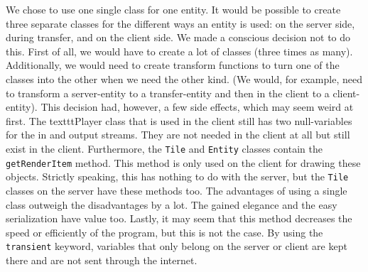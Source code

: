\documentclass[../main.tex]{subfiles}
\begin{document}
	We chose to use one single class for one entity. It would be possible to create three separate classes for the different ways an entity is used: on the server side, during transfer, and on the client side. We made a conscious decision not to do this. First of all, we would have to create a lot of classes (three times as many). Additionally, we would need to create transform functions to turn one of the classes into the other when we need the other kind. (We would, for example, need to transform a server-entity to a transfer-entity and then in the client to a client-entity). This decision had, however, a few side effects, which may seem weird at first. The texttt{Player} class that is used in the client still has two null-variables for the in and output streams. They are not needed in the client at all but still exist in the client. Furthermore, the \texttt{Tile} and \texttt{Entity} classes contain the \texttt{getRenderItem} method. This method is only used on the client for drawing these objects. Strictly speaking, this has nothing to do with the server, but the \texttt{Tile} classes on the server have these methods too. The advantages of using a single class outweigh the disadvantages by a lot. The gained elegance and the easy serialization have value too. Lastly, it may seem that this method decreases the speed or efficiently of the program, but this is not the case. By using the \texttt{transient} keyword, variables that only belong on the server or client are kept there and are not sent through the internet.    
\end{document}
